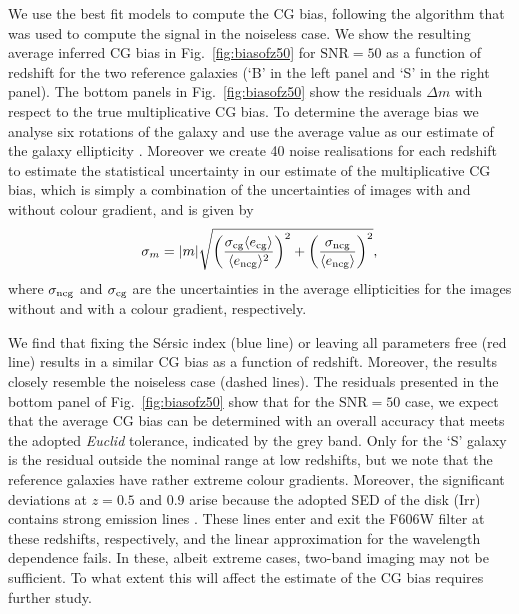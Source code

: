 \documentclass[useAMS,usenatbib]{mnras}
\newcommand{\be}{\begin{equation}}
\newcommand{\ee}{\end{equation}}
\newcommand{\rund}[1]{\left(#1\right)}
\def\elabel#1{\label{eq:#1}}
\begin{document}
We use the best fit models to compute the CG bias, following the
algorithm that was used to compute the signal in the noiseless
case. We show the resulting average inferred CG bias in
Fig.~\ref{fig:biasofz50} for \mbox{$\mathrm{SNR}=50$} as a function of
redshift for the two reference galaxies (`B' in the left panel and `S'
in the right panel). The bottom panels in Fig.~\ref{fig:biasofz50}
show the residuals $\Delta m$ with respect to the true multiplicative
CG bias. To determine the average bias we analyse six rotations of the
galaxy and use the average value as our estimate of the galaxy
ellipticity \citep{Nakajima07}.  Moreover we create 40 noise
realisations for each redshift to estimate the statistical uncertainty
in our estimate of the multiplicative CG bias, which is  simply a
combination of the uncertainties of images with and without colour
gradient, and is given by
%
\be
\sigma_m= |m| \sqrt{\rund{\sigma_{\rm cg} \langle e_{\rm cg} \rangle \over \langle e_{\rm ncg}\rangle^2 }^2
  + \rund{\sigma_{\rm ncg} \over \langle e_{\rm ncg} \rangle}^2 },
\elabel{sigmam}
\ee
%
where $\sigma_{\rm ncg}$ and $\sigma_{\rm cg}$ are the uncertainties in the average
ellipticities for the images without and with a colour gradient, respectively.

We find that fixing the S{\'e}rsic index (blue line) or leaving all parameters free (red line) results in a similar CG bias as a function of redshift. Moreover, the results closely resemble the noiseless case (dashed lines).
The residuals presented in the bottom panel of Fig.~\ref{fig:biasofz50} show that  for the \mbox{$\mathrm{SNR}=50$} case, we expect that the average CG bias can be determined with an overall accuracy that meets the adopted {\it Euclid} tolerance, indicated by the grey band. Only for the `S' galaxy is the residual outside the nominal range at low redshifts, but we note that the reference galaxies have rather extreme colour gradients.
Moreover, the significant deviations at $z=0.5$ and $0.9$ arise because the adopted SED of the disk (Irr) contains strong emission lines  . These lines enter and exit the F606W filter at these redshifts, respectively, and the linear approximation for the wavelength
dependence fails. In these, albeit extreme cases, two-band imaging may not be sufficient. To what extent this will affect the estimate of the CG bias requires further study.
\end{document}
